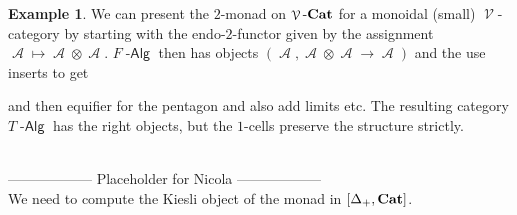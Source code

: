 \documentclass[a4paper,11pt,oneside,openany]{scrbook}
\newcommand{\catname}[1]{{\normalfont\textbf{#1}}}
\DeclareMathOperator{\Alg}{-\mathsf{Alg}}
\newcommand{\Cat}{\catname{Cat}}
\newcommand{\iso}{\cong}
\DeclareMathOperator{\V}{\mathcal{V}}
\DeclareMathOperator{\A}{\mathcal{A}}
\theoremstyle{definition}
\theoremstyle{definition}
\newtheorem{exmp}[thm]{Example}
\begin{document}
\begin{exmp}
   We can present the $2$-monad on $\V\text{-}\Cat$ for a monoidal (small) $\V$-category by starting with the endo-$2$-functor given by the assignment 
   $\A \mapsto \A \otimes \A$. $F\Alg$ then has objects $(\A,\A \otimes \A \to \A)$ and the use inserts to get  
      \begin{center}
      \end{center}
   and then equifier for the pentagon and also add limits etc. The resulting category $T\Alg$ has the right objects, but the $1$-cells preserve the structure strictly. 
\end{exmp}

~\\
------------------ Placeholder for Nicola ------------------
~\\

We need to compute the Kiesli object of the monad in $[\Delta_+,\Cat]$.




		\backmatter
	
\end{document}
